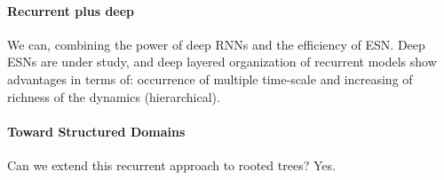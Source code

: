 \documentclass[10pt]{report}
\begin{document}
\paragraph{Recurrent plus deep} We can, combining the power of deep RNNs and the efficiency of ESN. Deep ESNs are under study, and deep layered organization of recurrent models show advantages in terms of: occurrence of multiple time-scale and increasing of richness of the dynamics (hierarchical).
\paragraph{Toward Structured Domains} Can we extend this recurrent approach to rooted trees? Yes.
\end{document}
